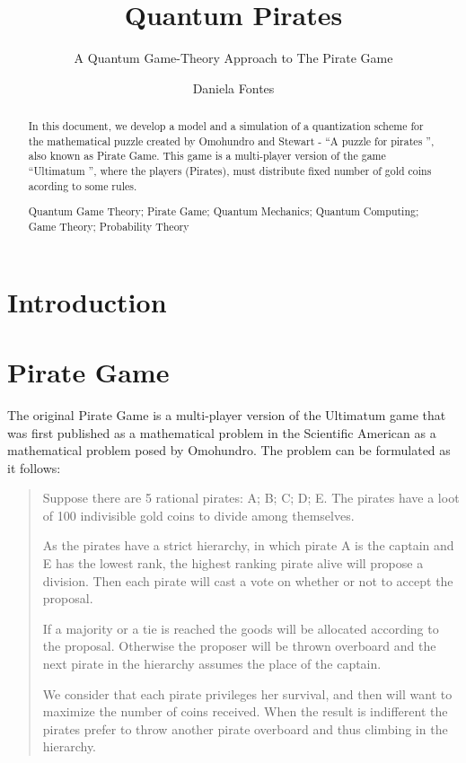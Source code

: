 \documentclass[10pt,twocolumn]{llncs}
\title{Quantum Pirates} %
\subtitle{A Quantum Game-Theory Approach to The Pirate Game}
\author{Daniela Fontes}
\institute{	
		Instituto Superior T\'ecnico
\\
\email{daniela.fontesl@ist.utl.pt}
}
\begin{document}
	\maketitle

	\begin{abstract}
		In this document, we develop a model and a simulation of a quantization scheme for the mathematical puzzle created by Omohundro and Stewart - ``A puzzle for pirates '', also known as Pirate Game. This game is a multi-player version of the game ``Ultimatum '', where the players (Pirates), must distribute fixed number of gold coins acording to some rules.

		\keywords Quantum Game Theory; Pirate Game; Quantum Mechanics; Quantum Computing; Game Theory; Probability Theory

\end{abstract}

\section{Introduction}




\section{Pirate Game}
\label{sec:pirate_description}

The original Pirate Game is a multi-player version of the Ultimatum game that was first published as a mathematical problem in the Scientific American as a mathematical problem posed by Omohundro\cite{Stewart1999}. The problem can be formulated as it follows:

\begin{quotation}
Suppose there are 5 rational pirates: A; B; C; D; E. The pirates have a  loot of 100 indivisible gold coins to divide among themselves.


As the pirates have a strict hierarchy, in which pirate A is the captain and E has the lowest rank, the highest ranking pirate alive will propose a division. Then each pirate will cast a vote on whether or not to accept the proposal. 

If a majority or a tie is reached the goods will be allocated according to the proposal. Otherwise the proposer will be thrown overboard and the next pirate in the hierarchy assumes the place of the captain. 

We consider that each pirate privileges her survival, and then will want to maximize the number of coins received. When the result is indifferent the pirates prefer to throw another pirate overboard and thus climbing in the hierarchy. 
\end{quotation}
\end{document}
